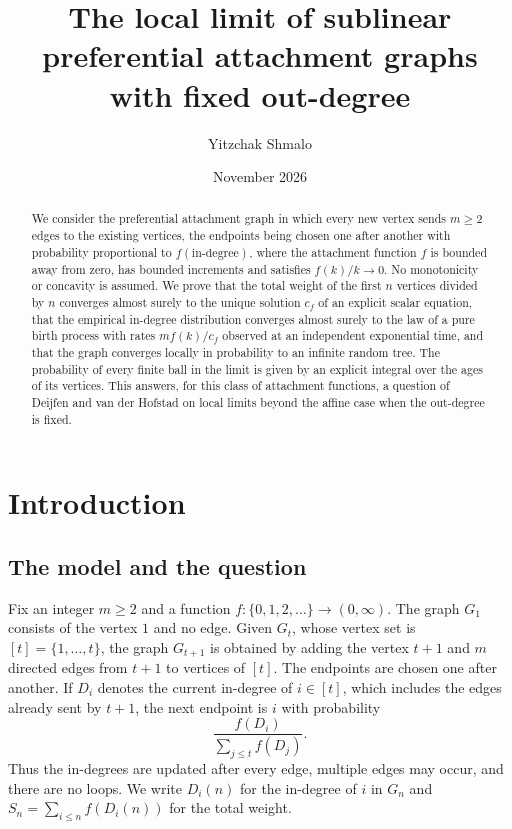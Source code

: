 \documentclass[11pt]{amsart}
\title[Sublinear preferential attachment with fixed out-degree]{The local limit of sublinear preferential
attachment graphs with fixed out-degree}
\author{Yitzchak Shmalo}
\date{November 2026}
\theoremstyle{definition}
\begin{document}
\begin{abstract}
We consider the preferential attachment graph in which every new vertex sends $m\ge2$ edges to the existing
vertices, the endpoints being chosen one after another with probability proportional to $f(\text{in-degree})$, where
the attachment function $f$ is bounded away from zero, has bounded increments and satisfies $f(k)/k\to0$. No
monotonicity or concavity is assumed. We prove that the total weight of the first $n$ vertices divided by $n$
converges almost surely to the unique solution $c_f$ of an explicit scalar equation, that the empirical in-degree
distribution converges almost surely to the law of a pure birth process with rates $mf(k)/c_f$ observed at an
independent exponential time, and that the graph converges locally in probability to an infinite random tree. The
probability of every finite ball in the limit is given by an explicit integral over the ages of its vertices. This
answers, for this class of attachment functions, a question of Deijfen and van der Hofstad on local limits beyond
the affine case when the out-degree is fixed.
\end{abstract}
\maketitle

\section{Introduction}

\subsection{The model and the question}

Fix an integer $m\ge2$ and a function $f:\{0,1,2,\dots\}\to(0,\infty)$. The graph $G_1$ consists of the vertex $1$
and no edge. Given $G_t$, whose vertex set is $[t]=\{1,\dots,t\}$, the graph $G_{t+1}$ is obtained by adding the
vertex $t+1$ and $m$ directed edges from $t+1$ to vertices of $[t]$. The endpoints are chosen one after another.
If $D_i$ denotes the current in-degree of $i\in[t]$, which includes the edges already sent by $t+1$, the next
endpoint is $i$ with probability
\[
     \frac{f(D_i)}{\sum_{j\le t}f(D_j)} .
\]
Thus the in-degrees are updated after every edge, multiple edges may occur, and there are no loops. We write
$D_i(n)$ for the in-degree of $i$ in $G_n$ and $S_n=\sum_{i\le n}f(D_i(n))$ for the total weight.
\end{document}
